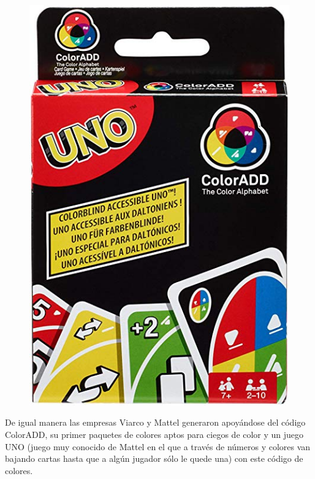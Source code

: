 \documentclass[10pt]{article}
\begin{document}
\begin{figure}[H]
	\begin{center}
\includegraphics[scale = 0.14]{Imagenes/UNO.jpg}
	\end{center} 
\end{figure}

De igual manera las empresas Viarco y Mattel generaron apoyándose del código ColorADD, su primer paquetes de colores aptos para ciegos de color y un juego UNO (juego muy conocido de Mattel en el que a través de números y colores van bajando cartas hasta que a algún jugador sólo le quede una) con este código de colores.   
\end{document}
